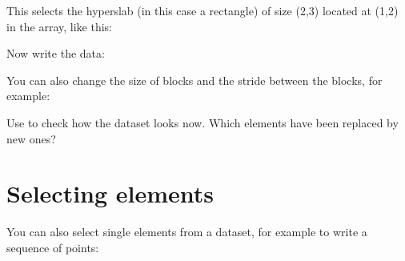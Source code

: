 \documentclass[letterpaper,10pt,english]{sphinxmanual}
\begin{document}
\sphinxAtStartPar
This selects the hyperslab (in this case a rectangle) of size (2,3) located at (1,2) in the array, like this:

\noindent{}

\sphinxAtStartPar
Now write the data:

\begin{sphinxVerbatim}[commandchars=\\\{\}]
        
\end{sphinxVerbatim}

\sphinxAtStartPar
You can also change the size of blocks and the stride between the blocks, for example:

\begin{sphinxVerbatim}[commandchars=\\\{\}]
\PYG{p}{[}\PYG{p}{]}  
\PYG{p}{[}\PYG{p}{]}  

\PYG{p}{[}\PYG{p}{]}  
\PYG{p}{[}\PYG{p}{]}  

        
\end{sphinxVerbatim}

\sphinxAtStartPar
Use  to check how the dataset looks now. Which elements have been replaced by new ones?


\chapter{Selecting elements}
\label{\detokenize{index:selecting-elements}}
\sphinxAtStartPar
You can also select single elements from a dataset, for example to write a sequence of points:
\end{document}
